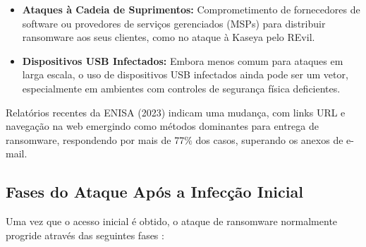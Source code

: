 \begin{itemize}
    \item \textbf{Ataques à Cadeia de Suprimentos:} Comprometimento de fornecedores de software ou provedores de serviços 
    gerenciados (MSPs) para distribuir ransomware aos seus clientes, como no ataque à Kaseya pelo REvil.
    
    \item \textbf{Dispositivos USB Infectados:} Embora menos comum para ataques em larga escala, o uso de dispositivos USB 
    infectados ainda pode ser um vetor, especialmente em ambientes com controles de segurança física deficientes.
\end{itemize}

Relatórios recentes da ENISA (2023) indicam uma mudança, com links URL e navegação na web 
emergindo como métodos dominantes para entrega de ransomware, respondendo por mais de 77\% dos casos, superando os anexos de e-mail.

\subsection{Fases do Ataque Após a Infecção Inicial}

Uma vez que o acesso inicial é obtido, o ataque de ransomware normalmente progride através das seguintes fases \cite{MasterDCRansomwareHowItWorks, ResearchGateRansomwareInfectionVector, Casino2025RansomwareDetection}:

